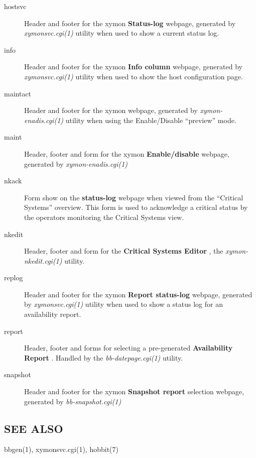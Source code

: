 \begin{description}
 

\item[hostsvc] Header and footer for the xymon \textbf{Status-log}
 webpage, generated by \emph{xymonsvc.cgi(1)}
 utility when used to show a current status log. 

 

\item[info] Header and footer for the xymon \textbf{Info column}
 webpage, generated by \emph{xymonsvc.cgi(1)}
 utility when used to show the host configuration page. 

 

\item[maintact] Header and footer for the xymon \textbf{}
 webpage, generated by \emph{xymon-enadis.cgi(1)}
 utility when using the Enable/Disable ``preview'' mode. 

 

\item[maint] Header, footer and form for the xymon \textbf{Enable/disable}
 webpage, generated by \emph{xymon-enadis.cgi(1)}


 

\item[nkack] Form show on the \textbf{status-log}
 webpage when viewed from the ``Critical Systems'' overview. This form is used to acknowledge a critical status by the operators monitoring the Critical Systems view. 

 

\item[nkedit] Header, footer and form for the \textbf{Critical Systems Editor}
, the \emph{xymon-nkedit.cgi(1)}
 utility. 

 

\item[replog] Header and footer for the xymon \textbf{Report status-log}
 webpage, generated by \emph{xymonsvc.cgi(1)}
 utility when used to show a status log for an availability report. 

 

\item[report] Header, footer and forms for selecting a pre-generated \textbf{Availability Report}
. Handled by the \emph{bb-datepage.cgi(1)}
 utility. 

 

\item[snapshot] Header and footer for the xymon \textbf{Snapshot report}
 selection webpage, generated by \emph{bb-snapshot.cgi(1)}


 


\end{description}

\subsection{SEE ALSO}
bbgen(1), xymonsvc.cgi(1), hobbit(7) 
